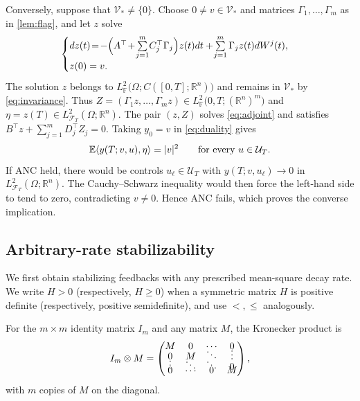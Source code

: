 \documentclass[twocolumn]{autart}
\begin{document}
\begin{pf}
Conversely, suppose that $\mathcal V_*\neq\{0\}$. Choose
$0\neq v\in\mathcal V_*$ and matrices $\Gamma_1,\dots,\Gamma_m$ as in
\cref{lem:flag}, and let $z$ solve\vspace{-3mm}
\begin{equation*}
\begin{cases}
dz(t)\! =\!-\Bigl(A^{\top}\!+\!\sum\limits_{j=1}^m\!C_j^{\top}\Gamma_j\Bigr)z(t) dt +\!\sum\limits_{j=1}^m\Gamma_jz(t) dW^j(t),\\[2pt] z(0)=v.
\end{cases}\vspace{-3mm}
\end{equation*}
The solution $z$ belongs to
$L^2_{\mathbb F}\bigl(\Omega;C([0,T];\mathbb R^n)\bigr)$ and remains in
$\mathcal V_*$ by \cref{eq:invariance}. Thus 
$Z=(\Gamma_1z,\dots,\Gamma_mz)
\in L^2_{\mathbb F}\bigl(0,T;(\mathbb R^n)^m\bigr)$
and $\eta=z(T)\in L^2_{\mathcal F_T}(\Omega;\mathbb R^n)$. The pair
$(z,Z)$ solves \cref{eq:adjoint} and satisfies
$B^{\top}z+\sum\limits_{j=1}^mD_j^{\top}Z_j=0$. Taking $y_0=v$ in
\cref{eq:duality} gives\vspace{-2mm}
\begin{equation*}
\mathbb E\langle y(T;v,u),\eta\rangle=|v|^2
\qquad\text{for every }u\in\mathcal U_T.\vspace{-2mm}
\end{equation*}
If ANC held, there would be controls $u_\ell\in\mathcal U_T$ with
$y(T;v,u_\ell)\to0$ in $L^2_{\mathcal F_T}(\Omega;\mathbb R^n)$.
The Cauchy--Schwarz inequality would then force the left-hand side to tend
to zero, contradicting $v\neq0$. Hence ANC fails, which proves the
converse implication.
\end{pf}

\vspace{-3mm}

\subsection{Arbitrary-rate stabilizability}\label{sec:strict-alternative}

We first obtain stabilizing feedbacks with any prescribed mean-square decay
rate. We write $H>0$ (respectively, $H\geq 0$) when a symmetric
matrix $H$ is positive definite (respectively, positive semidefinite), and
use $<,\leq $ analogously.

For the $m\times m$ identity matrix $I_m$ and any matrix $M$, the
Kronecker product is\vspace{-3mm}
\begin{equation*}
I_m\otimes M=
\begin{pmatrix}
M&0&\cdots&0\\[-8pt]
0&M&\ddots&\vdots\\[-8pt]
\vdots&\ddots&\ddots&0\\[-8pt]
0&\cdots&0&M
\end{pmatrix},\vspace{-2mm}
\end{equation*}
with $m$ copies of $M$ on the diagonal.
\end{document}
